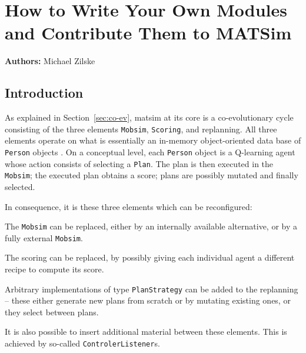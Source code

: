 \chapter{How to Write Your Own Modules and Contribute Them to MATSim}
\label{ch:extensionpoints}
\hfill \textbf{Authors:} Michael Zilske

\section{Introduction}
\label{sec:ownmodules-intro}


As explained in Section~\ref{sec:co-ev}, \acrshort{matsim} at its core is a co-evolutionary cycle consisting of the three elements \lstinline$Mobsim$, \lstinline$Scoring$, and replanning.  All three elements operate on what is essentially an in-memory object-oriented data base of \lstinline$Person$ objects \citep{RaneyNagel2006traf-framework}.  
%
On a conceptual level, each \lstinline$Person$ object is a Q-learning agent \citep[][Chapter~21]{RusselNorvig2010ArtificialIntelligence} whose action consists of selecting a \lstinline$Plan$.  The plan is then executed in the \lstinline$Mobsim$; the executed plan obtains a score; plans are possibly mutated and finally selected.

In consequence, it is these three elements which can be reconfigured:
\begin{compactitem}

\item The \lstinline$Mobsim$ can be replaced, either by an internally available alternative, or by a fully external \lstinline$Mobsim$.


\item The scoring can be replaced, by possibly giving each individual agent a different recipe to compute its score.

\item Arbitrary implementations of type \lstinline$PlanStrategy$ can be added to the replanning -- these either generate new plans from scratch or by mutating existing ones, or they select between plans.

\end{compactitem}
It is also possible to insert additional material between these elements.  This is achieved by so-called \lstinline$ControlerListener$s.

